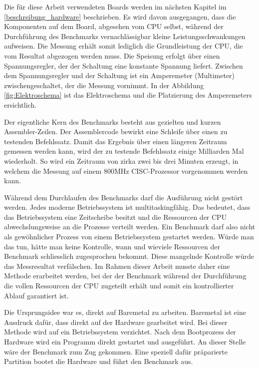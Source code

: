 Die für diese Arbeit verwendeten Boards werden im nächsten Kapitel im \autoref{beschreibung_hardware} beschrieben. Es wird davon ausgegangen, dass die Komponenten auf dem Board, abgesehen vom CPU selbst, während der Durchführung des Benchmarks vernachlässigbar kleine Leistungsschwankungen aufweisen. Die Messung erhält somit lediglich die Grundleistung der CPU, die vom Resultat abgezogen werden muss. Die Speisung erfolgt über einen Spannungsregler, der der Schaltung eine konstante Spannung liefert. Zwischen dem Spannungsregler und der Schaltung ist ein Amperemeter (Multimeter) zwischengeschaltet, der die Messung vornimmt. In der Abbildung \ref{fig:Elektroschema} ist das Elektroschema und die Platzierung des Amperemeters ersichtlich.
\par
Der eigentliche Kern des Benchmarks besteht aus gezielten und kurzen Assembler-Zeilen. Der Assemblercode bewirkt eine Schleife über einen zu testenden Befehlssatz. Damit das Ergebnis über einen längeren Zeitraum gemessen werden kann, wird der zu testende Befehlssatz einige Milliarden Mal  wiederholt. So wird ein Zeitraum von zirka zwei bis drei Minuten erzeugt, in welchem die Messung auf einem 800MHz CISC-Prozessor vorgenommen werden kann.
\par
Während dem Durchlaufen des Benchmarks darf die Ausführung nicht gestört werden. Jedes moderne Betriebssystem ist multitaskingfähig. Das bedeutet, dass das Betriebssystem eine Zeitscheibe besitzt und die Ressourcen der CPU abwechslungsweise an die Prozesse verteilt werden. Ein Benchmark darf also nicht als gewöhnlicher Prozess von einem Betriebssystem gestartet werden. Würde man das tun, hätte man keine Kontrolle, wann und wieviele Ressourcen der Benchmark schliesslich zugesprochen bekommt. Diese mangelnde Kontrolle würde das Messresultat verfälschen. Im Rahmen dieser Arbeit musste daher eine Methode erarbeitet werden, bei der der Benchmark während der Durchführung die vollen Ressourcen der CPU zugeteilt erhält und somit ein kontrollierter Ablauf garantiert ist.
\par
Die Ursprungsidee war es, direkt auf Baremetal zu arbeiten. Baremetal ist eine Ausdruck dafür, dass direkt auf der Hardware gearbeitet wird. Bei dieser Methode wird auf ein Betriebssystem verzichtet. Nach dem Bootprozess der Hardware wird ein Programm direkt gestartet und ausgeführt. An dieser Stelle wäre der Benchmark zum Zug gekommen. Eine speziell dafür präparierte Partition bootet die Hardware und führt den Benchmark aus.
\par
